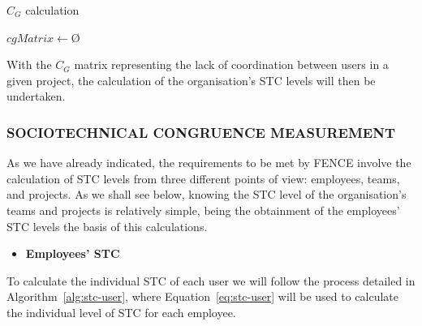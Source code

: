 \begin{algorithm}
    
    \DontPrintSemicolon
    
    \caption{$C_G$ calculation}
    \label{alg:cg}
        
        $cgMatrix \longleftarrow $\O$ $\;
       
    
\end{algorithm}

With the $C_G$ matrix representing the lack of coordination between users in a given project, the calculation of the organisation's STC levels will then be undertaken.

\subsubsection{SOCIOTECHNICAL CONGRUENCE MEASUREMENT}

As we have already indicated, the requirements to be met by FENCE involve the calculation of STC levels from three different points of view: employees, teams, and projects. As we shall see below, knowing the STC level of the organisation's teams and projects is relatively simple, being the obtainment of the employees' STC levels the basis of this calculations.

\begin{itemize}
\item \textbf{Employees' STC}
\end{itemize}

To calculate the individual STC of each user we will follow the process detailed in Algorithm~\ref{alg:stc-user}, where Equation~\ref{eq:stc-user} will be used to calculate the individual level of STC for each employee.

